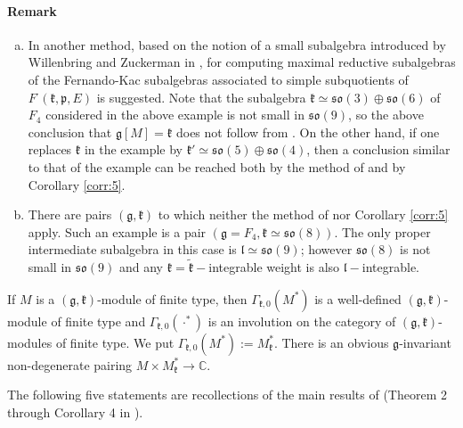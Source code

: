\documentclass[default]{./styles/svmult}
\newcommand{\field}[1]{\mathbb{#1}}
\renewcommand{\gg}{\mathfrak{g}}
\newcommand{\kk}{\mathfrak{k}}
\renewcommand{\ll}{\mathfrak{l}}
\newcommand{\pp}{\mathfrak{p}}
\newcommand{\so}{\mathfrak{so}}
\begin{document}
\paragraph{\textbf{Remark}}
\begin{enumerate}[a)]

\item In \cite{PZ1} another method, based on the notion of a small subalgebra introduced by Willenbring and Zuckerman in \cite{WZ}, for computing maximal reductive subalgebras of the Fernando-Kac subalgebras associated to simple subquotients of $F^\cdot(\kk,\pp,E)$ is suggested. Note that the subalgebra $\kk \simeq \so(3) \oplus \so(6)$ of $F_4$ considered in the above example is not small in $\so(9)$, so the above conclusion that $\gg[M] = \kk$ does not follow from \cite{PZ1}. On the other hand, if one replaces $\kk$ in the example by $\kk'\simeq\so(5)\oplus\so(4)$, then a conclusion similar to that of the example can be reached both by the method of \cite{PZ1} and by Corollary \ref{corr:5}.

\item There are pairs $(\gg,\kk)$ to which neither the method of \cite{PZ1} nor Corollary \ref{corr:5} apply. Such an example is a pair $(\gg = F_4, \kk\simeq\so(8))$. The only proper intermediate subalgebra in this case is $\ll \simeq \so(9)$; however $\so(8)$ is not small in $\so(9)$ and any $\kk=\tilde{\kk}-$integrable weight is also $\ll-$integrable.  
\end{enumerate}


If $M$ is a $(\gg,\kk)$-module of finite type, then $\Gamma_{\kk,0}(M^*)$ is a well-defined $(\gg,\kk)$-module of finite type and $\Gamma_{\kk,0}(\cdot^*)$ is an involution on the category of $(\gg,\kk)$-modules of finite type. We put $\Gamma_{\kk,0}(M^*):=M_\kk^*$. There is an obvious $\gg$-invariant non-degenerate pairing $M\times M_\kk^*\rightarrow\field{C}$.

\vspace{0.5cm}

The following five statements are recollections of the main results of \cite{PZ2} (Theorem 2 through Corollary 4 in \cite{PZ2}).
\end{document}
